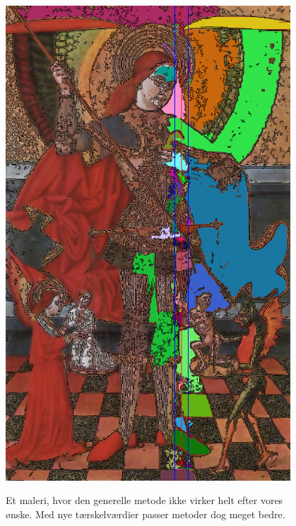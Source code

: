 \begin{figure}[!h]
{        \includegraphics[angle=270,width=0.95\textwidth]{afsnit/afprovning/billeder/thressholds/krafitige_farver/krafite_detalier/s7_e200_f5.png}
        \label{GRD_virker_nesten1_super}}\\
     \caption[]{Et maleri, hvor den generelle metode ikke virker helt 
	 efter vores ønske. Med nye tærskelværdier passer metoder dog meget
	 bedre.}
     \label{generelde_region_detektor_virker_nesten1}
\end{figure}

